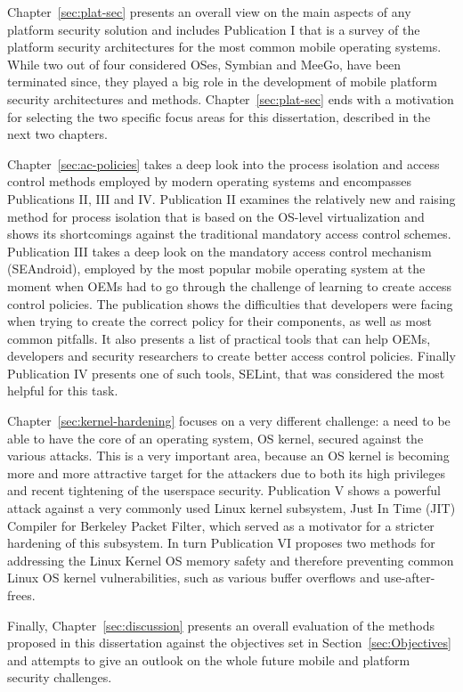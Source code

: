 Chapter~\ref{sec:plat-sec} presents an overall view on the main aspects of any platform security solution and includes Publication I that is a survey of the platform security architectures for the most common mobile operating systems. While two out of four considered OSes, Symbian and MeeGo, have been terminated since, they played a big role in the development of mobile platform security architectures and methods. Chapter~\ref{sec:plat-sec} ends with a motivation for selecting the two specific focus areas for this dissertation, described in the next two chapters. 

Chapter~\ref{sec:ac-policies} takes a deep look into the process isolation and access control methods employed by modern operating systems and encompasses Publications II, III and IV. Publication II examines the relatively new and raising method for process isolation that is based on the OS-level virtualization and shows its shortcomings against the traditional mandatory access control schemes. Publication III takes a deep look on the mandatory access control mechanism (SEAndroid), employed by the most popular mobile operating system at the moment when OEMs had to go through the challenge of learning to create access control policies. The publication shows the difficulties that developers were facing when trying to create the correct policy for their components, as well as most common pitfalls. It also presents a list of practical tools that can help OEMs, developers and security researchers to create better access control policies. Finally Publication IV presents one of such tools, SELint, that was considered the most helpful for this task. 

Chapter~\ref{sec:kernel-hardening} focuses on a very different challenge: a need to be able to have the core of an operating system, OS kernel, secured against the various attacks. This is a very important area, because an OS kernel is becoming more and more attractive target for the attackers due to both its high privileges and recent tightening of the userspace security. Publication V shows a powerful attack against a very commonly used Linux kernel subsystem, Just In Time (JIT) Compiler for Berkeley Packet Filter, which served as a motivator for a stricter hardening of this subsystem. In turn Publication VI proposes two methods for addressing the Linux Kernel OS memory safety and therefore preventing common Linux OS kernel vulnerabilities, such as various buffer overflows and use-after-frees. 

Finally, Chapter~\ref{sec:discussion} presents an overall evaluation of the methods proposed in this dissertation against the objectives set in Section~\ref{sec:Objectives} and attempts to give an outlook on the whole future mobile and platform security challenges. 

